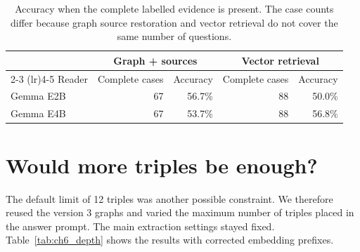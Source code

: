 \begin{table}[htbp]
  \centering
  \small
  \setlength{\tabcolsep}{7pt}
  \begin{tabular}{lrrrr}
    \toprule
    & \multicolumn{2}{c}{Graph + sources} & \multicolumn{2}{c}{Vector retrieval} \\
    \cmidrule(lr){2-3} \cmidrule(lr){4-5}
    Reader & Complete cases & Accuracy & Complete cases & Accuracy \\
    \midrule
    Gemma E2B & 67 & 56.7\% & 88 & 50.0\% \\
    Gemma E4B & 67 & 53.7\% & 88 & 56.8\% \\
    \bottomrule
  \end{tabular}
  \caption{Accuracy when the complete labelled evidence is present. The case counts differ because
           graph source restoration and vector retrieval do not cover the same number of questions.}
  \label{tab:ch4_complete_use}
\end{table}

\section{Would more triples be enough?}
\label{sec:ch6_depth}

The default limit of 12 triples was another possible constraint. We therefore reused the
version 3 graphs and varied the maximum number of triples placed in the answer prompt.
The main extraction settings stayed fixed. Table~\ref{tab:ch6_depth} shows the results with
corrected embedding prefixes.

